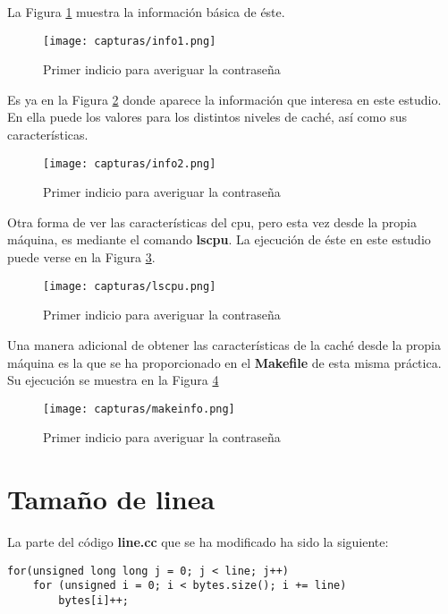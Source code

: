 La Figura \ref{fig:figura1} muestra la información básica de éste. 
	\begin{figure}[H] %
		\centering
		\texttt{[image: capturas/info1.png]} 
		\caption{Primer indicio para averiguar la contraseña} 
		\label{fig:figura1}
	\end{figure}

Es ya en la Figura \ref{fig:figura2} donde aparece la información que interesa en este estudio. En ella puede los valores para los distintos niveles de caché, así como sus características.	
	
	\begin{figure}[H] %
		\centering
		\texttt{[image: capturas/info2.png]} 
		\caption{Primer indicio para averiguar la contraseña} 
		\label{fig:figura2}
	\end{figure}
\vspace{-15pt}
\newpage

Otra forma de ver las características del cpu, pero esta vez desde la propia máquina, es mediante el comando \textbf{lscpu}.
La ejecución de éste en este estudio puede verse en la Figura \ref{fig:figura3}.
	\begin{figure}[H] %
		\centering
		\texttt{[image: capturas/lscpu.png]} 
		\caption{Primer indicio para averiguar la contraseña} 
		\label{fig:figura3}
	\end{figure}

Una manera adicional de obtener las características de la caché desde la propia máquina es la que se ha proporcionado en el \textbf{Makefile} de esta misma práctica.
Su ejecución se muestra en la Figura \ref{fig:figura4}
	\begin{figure}[H] %
		\centering
		\texttt{[image: capturas/makeinfo.png]} 
		\caption{Primer indicio para averiguar la contraseña} 
		\label{fig:figura4}
	\end{figure}
\newpage

\section{Tamaño de linea}

La parte del código \textbf{line.cc} que se ha modificado ha sido la siguiente:

\begin{lstlisting}
for(unsigned long long j = 0; j < line; j++)
	for (unsigned i = 0; i < bytes.size(); i += line)
		bytes[i]++;
\end{lstlisting}

